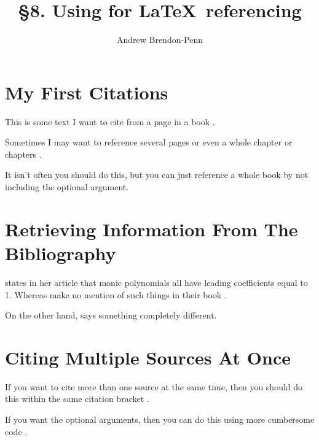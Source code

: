\documentclass[a4paper,11pt]{article}
\title{\S 8. Using \hologo{BibTeX} for \LaTeX\, referencing}
\author{Andrew Brendon-Penn}
\date{}
\begin{document}
\maketitle

\section{My First Citations}

This is some text I want to cite from a page in a book \citep[p.~7]{LPSP}.

Sometimes I may want to reference several pages \citep[pp.~31--42]{MTS} or even a whole chapter \citep[\S~3]{LDC} or chapters \citep[\S\S~6--8]{MTS}.

It isn't often you should do this, but you can just reference a whole book \citep{ATD} by not including the optional argument.

\section{Retrieving Information From The Bibliography}

\citeauthor{LDC} %
states in her \citeyear{LDC}  %
article \citep[p.~7]{LDC} that monic polynomials all have leading coefficients equal to 1. Whereas  %
make no mention of such things in their book \citep{LPSP}.

On the other hand,  %
says something completely different.

\section{Citing Multiple Sources At Once}

If you want to cite more than one source at the same time, then you should do this within the same citation bracket \citep{ATD, MTS}.

If you want the optional arguments, then you can do this using more cumbersome code \citetext{\citealp[p.~10]{ATD};~\citealp[pp.~23--27]{MTS}}.


\end{document}
